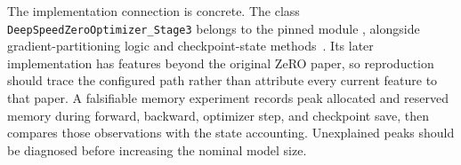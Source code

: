 The implementation connection is concrete. The class \texttt{DeepSpeed\allowbreak ZeroOptimizer\allowbreak\_Stage3} belongs to the pinned module , alongside gradient-partitioning logic and checkpoint-state methods~\cite{repo_deepspeed}. Its later implementation has features beyond the original ZeRO paper, so reproduction should trace the configured path rather than attribute every current feature to that paper. A falsifiable memory experiment records peak allocated and reserved memory during forward, backward, optimizer step, and checkpoint save, then compares those observations with the state accounting. Unexplained peaks should be diagnosed before increasing the nominal model size.

